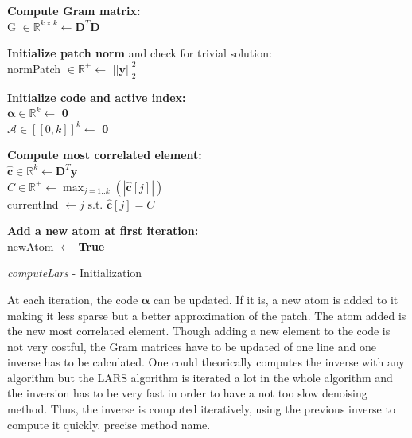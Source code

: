 \documentclass{ipol}
\newcommand{\dsize}{k}
\newcommand{\dict}{\textbf{D}}
\newcommand{\code}{\bm{\alpha}}
\newcommand{\noi}{\textbf{y}}
\newcommand{\clars}{\hat{\textbf{c}}}
\newcommand{\A}{\mathcal{A}}
\newcommand{\RR}{\mathbb{R}}
\begin{document}
\begin{algorithm}[H]

\textbf{Compute Gram matrix:}\\
\vspace{0.5mm}
G $\in \mathbb{R}^{\dsize \times \dsize} \leftarrow \dict^T\dict$\\
\vspace{2mm}

\textbf{Initialize patch norm} and check for trivial solution:\\
\vspace{0.5mm}
normPatch $\in \mathbb{R}^+ \leftarrow$ $||\noi||^2_2$\\
\vspace{2mm}

\textbf{Initialize code and active index:}\\
\vspace{0.5mm}
$\code \in \mathbb{R}^{\dsize} \leftarrow$ \textbf{0}\\
$\A \in [\![0, \dsize]\!]^{\dsize} \leftarrow$ \textbf{0}\\
\vspace{2mm}

\textbf{Compute most correlated element:}\\
\vspace{0.5mm}
$\clars \in \RR^{\dsize} \leftarrow \dict^T \noi$\\
$C \in \RR^+ \leftarrow \max_{j=1..\dsize}(|\clars[j]|)$ \\
currentInd $\leftarrow j \text{ s.t. } \clars[j] = C$\\
\vspace{2mm}

\textbf{Add a new atom at first iteration:}\\
\vspace{0.5mm}
newAtom $\leftarrow$ \textbf{True}\\
\vspace{2mm}

\caption{\textit{computeLars} - Initialization}
\end{algorithm}

\newpage

\noindent At each iteration, the code $\code$ can be updated. If it is, a new atom is added to it making it less sparse but a better approximation of the patch. The atom added is the new most correlated element. Though adding a new element to the code is not very costful, the Gram matrices have to be updated of one line and one inverse has to be calculated. One could theorically computes the inverse with any algorithm but the LARS algorithm is iterated a lot in the whole algorithm and the inversion has to be very fast in order to have a not too slow denoising method. Thus, the inverse is computed iteratively, using the previous inverse to compute it quickly. {\color{red} precise method name.}\\
\end{document}
